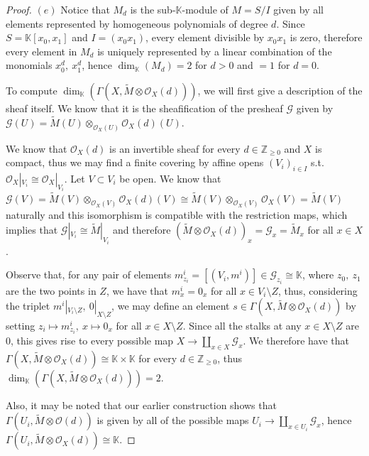 \documentclass{article}
\newcommand{\numberset}{\mathbb}
\newcommand{\Z}{\numberset{Z}}
\newcommand{\K}{\numberset{K}}
\begin{document}
\begin{proof}
    $(e)$ Notice that $M_d$ is the sub-$\K$-module of $M=S/I$ given by all
    elements represented by homogeneous polynomials of degree $d$. Since
    $S=\K[x_0,x_1]$ and $I=(x_0x_1)$, every element divisible
    by $x_0x_1$ is zero, therefore every element in $M_d$ is uniquely
    represented by a linear combination of the monomials $x_0^d,\ x_1^d$, hence
    $\dim_\K(M_d)=2$ for $d>0$ and $=1$ for $d=0$.

    To compute $\dim_\K(\Gamma(X,\tilde{M}\otimes\mathcal{O}_X(d)))$, we will
    first give a description of the sheaf itself. We know that it is the
    sheafification of the presheaf $\mathcal{G}$ given by
    $\mathcal{G}(U)=\tilde{M}(U)\otimes_{\mathcal{O}_X(U)}\mathcal{O}_X(d)(U)$.

    We know that $\mathcal{O}_X(d)$ is an invertible sheaf for every
    $d\in\Z_{\geq 0}$ and $X$ is compact, thus we may find a finite covering by
    affine opens
    $(V_i)_{i\in I}$ s.t. $\mathcal{O}_X|_{V_i}\cong\mathcal{O}_X|_{V_i}$.
    Let $V\subset V_i$ be
    open. We know that $\mathcal{G}(V)=\tilde{M}(V)\otimes_{\mathcal{O}_X(V)}
    \mathcal{O}_X(d)(V)\cong\tilde{M}(V)
    \otimes_{\mathcal{O}_X(V)}\mathcal{O}_X(V)=
    \tilde{M}(V)$ naturally and this isomorphism is compatible with
    the restriction maps, which implies that
    $\mathcal{G}|_{V_i}\cong\tilde{M}|_{V_i}$ and therefore
    $(\tilde{M}\otimes\mathcal{O}_X(d))_x=\mathcal{G}_x=\tilde{M}_x$ for all
    $x\in X$.

    Observe that, for any pair of elements
    $m^i_{z_i}=[(V_i,m^i)]\in\mathcal{G}_{z_i}\cong\K$, where $z_0,\ z_1$ are
    the two points in $Z$, we have that $m^i_x=0_x$ for all
    $x\in V_i\setminus Z$, thus, considering the triplet
    $m^i|_{V_i\setminus Z},\ 0|_{X\setminus Z}$, we may define an element
    $s\in\Gamma(X,\tilde{M}\otimes\mathcal{O}_X(d))$ by setting
    $z_i\mapsto m^i_{z_i},\ x\mapsto 0_x$ for all
    $x\in X\setminus Z$. Since all the stalks at any $x\in X\setminus Z$ are 0,
    this gives rise to every possible map $X\rightarrow\amalg_{x\in
    X}\mathcal{G}_x$. We therefore have that
    $\Gamma(X,\tilde{M}\otimes\mathcal{O}_X(d))\cong\K\times\K$ for every
    $d\in\Z_{\geq 0}$, thus
    $\dim_\K(\Gamma(X,\tilde{M}\otimes\mathcal{O}_X(d)))=2$.

    Also, it may be noted that our earlier construction shows that
    $\Gamma(U_i,\tilde{M}\otimes\mathcal{O}(d))$ is given by all of the possible
    maps $U_i\rightarrow\amalg_{x\in U_i}\mathcal{G}_x$, hence
    $\Gamma(U_i,\tilde{M}\otimes\mathcal{O}_X(d))\cong\K$.
\end{proof}
\end{document}
